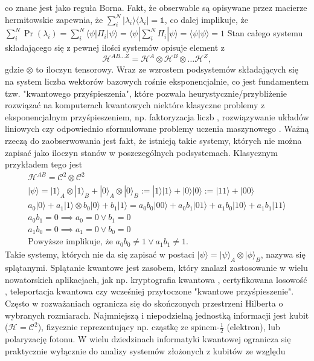 \documentclass[10pt]{article} %
\newcommand{\Hx}[1]{\mathcal{H}^{#1}}
\newcommand{\Pro}[1]{\Pr(#1)}
\newcommand{\Ket}[1]{|#1\rangle}
\newcommand{\Bra}[1]{\langle#1|}
\newcommand{\Braket}[1]{\langle#1\rangle}
\newcommand{\KP}{\Ket{\psi}}
\newcommand{\BP}{\Bra{\psi}}
\begin{document}
co znane jest jako reguła Borna. Fakt, że obserwable są opisywane przez macierze hermitowskie zapewnia, że $\sum^N_i \Ket{\lambda_i}\Bra{\lambda_i} = \mathbb{1}$, co dalej implikuje, że $\sum^N_i \Pro{\lambda_i} = \sum^N_i \BP \Pi_i \KP = \BP \sum^N_i \Pi_i \KP = \Braket{\psi | \psi} = 1$
Stan całego systemu składającego się z pewnej ilości systemów opisuje element z
\begin{equation}
\Hx{AB\dots Z} = \Hx{A} \otimes \Hx{B} \otimes \dots \Hx{Z},
\end{equation}
gdzie $\otimes$ to iloczyn tensorowy. Wraz ze wzrostem podsystemów składających się na system liczba wektorów bazowych rośnie eksponencjalnie, co jest fundamentem tzw. "kwantowego przyśpieszenia", które pozwala heurystycznie/przybliżenie rozwiązać na komputerach kwantowych niektóre klasyczne problemy z eksponencjalnym przyśpieszeniem,
np. faktoryzacja liczb \cite{shor}, rozwiązywanie układów liniowych \cite{soeq} czy odpowiednio sformułowane problemy uczenia maszynowego \cite{qsvm, qpca}.
Ważną rzeczą do zaobserwowania jest fakt, że istnieją takie systemy, których nie można zapisać jako iloczyn stanów w poszczególnych podsystemach. Klasycznym przykładem tego jest
\begin{gather*}
\Hx{AB} = \mathcal{C}^2 \otimes \mathcal{C}^2 \\
\KP = \Ket{1}_A \otimes \Ket{1}_B + \Ket{0}_A \otimes \Ket{0}_B := \Ket{1}\Ket{1} + \Ket{0}\Ket{0} := \Ket{11} + \Ket{00} \\
a_0\Ket{0} + a_1\Ket{1} \otimes b_0\Ket{0} + b_1\Ket{1} = a_0b_0 \Ket{00} + a_0b_1\Ket{01} + a_1b_0\Ket{10} + a_1b_1\Ket{11} \\
a_0b_1 = 0\implies a_0 = 0\vee b_1 = 0 \\
a_1b_0 = 0\implies a_1 = 0\vee b_0 = 0 \\
\text{Powyższe implikuje, że } a_0b_0 \neq 1 \vee a_1b_1 \neq 1.
\end{gather*} Takie systemy, których nie da się zapisać w postaci $\Ket{\psi} = \Ket{\psi}_A \otimes \Ket{\phi}_B$, nazywa się splątanymi. Splątanie kwantowe jest zasobem, który znalazł zastosowanie w wielu nowatorskich aplikacjach, jak np. kryptografia kwantowa \cite{crypto}, certyfikowana losowość \cite{rand}, teleportacja kwantowa \cite{qt} czy wcześniej przytoczone "kwantowe przyśpieszenie".
Często w rozważaniach ogranicza się do skończonych przestrzeni Hilberta o wybranych rozmiarach. Najmniejszą i niepodzielną jednostką informacji jest kubit ($\Hx{} = \mathcal{C}^2$), fizycznie reprezentujący np. cząstkę ze spinem-$\frac{1}{2}$ (elektron), lub polaryzację fotonu. W wielu dziedzinach informatyki kwantowej ogranicza się praktycznie wyłącznie do analizy systemów złożonych z kubitów ze względu
\end{document}
